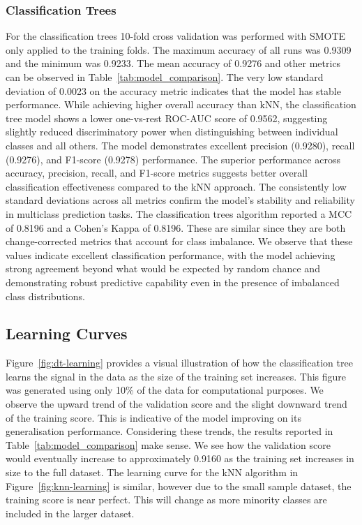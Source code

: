 \documentclass[10pt, conference]{IEEEtran}
\begin{document}
\subsubsection{Classification Trees}
For the classification trees 10-fold cross validation was performed with SMOTE only applied to the training folds. The maximum accuracy of all runs was 0.9309 and the minimum was 0.9233. The mean accuracy of 0.9276 and other metrics can be observed in Table~\ref{tab:model_comparison}. The very low standard deviation of 0.0023 on the accuracy metric indicates that the model has stable performance. While achieving higher overall accuracy than kNN, the classification tree model shows a lower one-vs-rest ROC-AUC score of 0.9562, suggesting slightly reduced discriminatory power when distinguishing between individual classes and all others. The model demonstrates excellent precision (0.9280), recall (0.9276), and F1-score (0.9278) performance. The superior performance across accuracy, precision, recall, and F1-score metrics suggests better overall classification effectiveness compared to the kNN approach. The consistently low standard deviations across all metrics confirm the model's stability and reliability in multiclass prediction tasks. The classification trees algorithm reported a MCC of 0.8196 and a Cohen's  Kappa of 0.8196. These are similar since they are both change-corrected metrics that account for class imbalance. We observe that these values indicate excellent classification performance, with the model achieving strong agreement beyond what would be expected by random chance and demonstrating robust predictive capability even in the presence of imbalanced class distributions.

\subsection{Learning Curves}
Figure~\ref{fig:dt-learning} provides a visual illustration of how the classification tree learns the signal in the data as the size of the training set increases. This figure was generated using only 10\% of the data for computational purposes. We observe the upward trend of the validation score and the slight downward trend of the training score. This is indicative of the model improving on its generalisation performance. Considering these trends, the results reported in Table~\ref{tab:model_comparison} make sense. We see how the validation score would eventually increase to approximately 0.9160 as the training set increases in size to the full dataset. The learning curve for the kNN algorithm in Figure~\ref{fig:knn-learning} is similar, however due to the small sample dataset, the training score is near perfect. This will change as more minority classes are included in the larger dataset.
\end{document}
